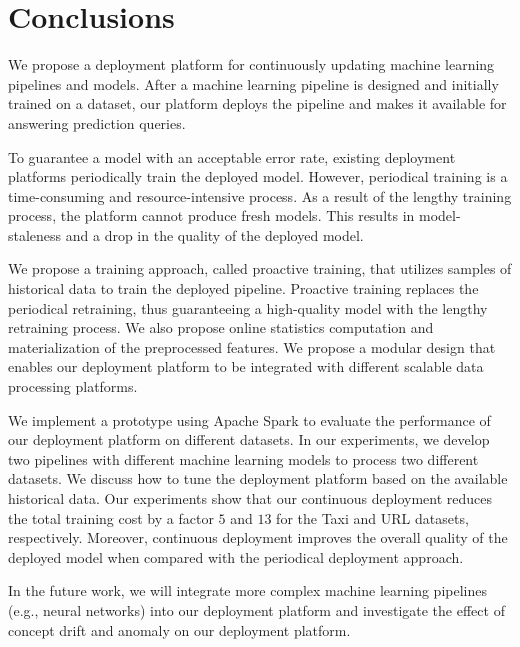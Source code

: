 \section{Conclusions} \label{conclusion}
We propose a deployment platform for continuously updating machine learning pipelines and models.
After a machine learning pipeline is designed and initially trained on a dataset, our platform deploys the pipeline and makes it available for answering prediction queries.

To guarantee a model with an acceptable error rate, existing deployment platforms periodically train the deployed model. 
However, periodical training is a time-consuming and resource-intensive process.
As a result of the lengthy training process, the platform cannot produce fresh models.
This results in model-staleness and a drop in the quality of the deployed model.

We propose a training approach, called proactive training, that utilizes samples of historical data to train the deployed pipeline.
Proactive training replaces the periodical retraining, thus guaranteeing a high-quality model with the lengthy retraining process.
We also propose online statistics computation and materialization of the preprocessed features.
We propose a modular design that enables our deployment platform to be integrated with different scalable data processing platforms.

We implement a prototype using Apache Spark to evaluate the performance of our deployment platform on different datasets.
In our experiments, we develop two pipelines with different machine learning models to process two different datasets.
We discuss how to tune the deployment platform based on the available historical data.
Our experiments show that our continuous deployment reduces the total training cost by a factor $5$ and $13$ for the Taxi and URL datasets, respectively.
Moreover, continuous deployment improves the overall quality of the deployed model when compared with the periodical deployment approach.

In the future work, we will integrate more complex machine learning pipelines (e.g., neural networks) into our deployment platform and investigate the effect of concept drift and anomaly on our deployment platform.

